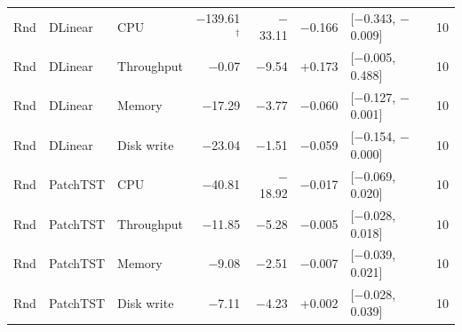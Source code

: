 \begin{longtable}{@{}lllrrrlr@{}}
Rnd & DLinear & CPU & $-$139.61$^{\dagger}$ & $-$33.11 & $-$0.166 & [$-$0.343, $-$0.009] & 10 \\
Rnd & DLinear & Throughput & $-$0.07 & $-$9.54 & +0.173 & [$-$0.005, 0.488] & 10 \\
Rnd & DLinear & Memory & $-$17.29 & $-$3.77 & $-$0.060 & [$-$0.127, $-$0.001] & 10 \\
Rnd & DLinear & Disk write & $-$23.04 & $-$1.51 & $-$0.059 & [$-$0.154, $-$0.000] & 10 \\
Rnd & PatchTST & CPU & $-$40.81 & $-$18.92 & $-$0.017 & [$-$0.069, 0.020] & 10 \\
Rnd & PatchTST & Throughput & $-$11.85 & $-$5.28 & $-$0.005 & [$-$0.028, 0.018] & 10 \\
Rnd & PatchTST & Memory & $-$9.08 & $-$2.51 & $-$0.007 & [$-$0.039, 0.021] & 10 \\
Rnd & PatchTST & Disk write & $-$7.11 & $-$4.23 & +0.002 & [$-$0.028, 0.039] & 10 \\
\end{longtable}
\normalsize\setlength{\tabcolsep}{4pt}

